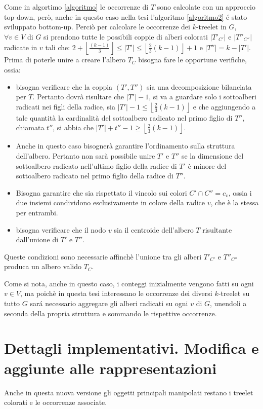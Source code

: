 Come in algortimo \ref{algoritmo} le occorrenze di $ T $ sono calcolate con un approccio top-down,  per\`o, anche in questo caso nella tesi l'algoritmo \ref{algoritmo2} \'e stato sviluppato bottom-up.
Perci\`o per calcolare le occorrenze dei $ k $-treelet in $ G $, $ \forall v \in V $ di $ G $ si prendono tutte le possibili coppie di alberi colorati $ |T'_{C'}| $ e $ |T''_{C''}| $ radicate in $ v $ tali che: $ 2+ \left\lfloor \frac{(k-1)}{3}  \right\rfloor \le |T'| \le \left\lfloor \frac{2}{3}(k-1) \right\rfloor  +1 $ e $ |T''| = k-|T'| $.
Prima di poterle unire a creare l'albero $ T_C $ bisogna fare le opportune verifiche, ossia:
\begin{itemize}
	\item bisogna verificare che la coppia $ (T',T'') $ sia una decomposizione bilanciata per $ T $.
	Pertanto dovr\`a risultare che $ |T'|-1 $, si va a guardare solo i sottoalberi radicati nei figli della radice, sia  
	$ |T'| - 1 \le \left\lfloor\frac{2}{3}(k-1)\right\rfloor $ e che aggiungendo a tale quantit\`a la cardinalit\`a del sottoalbero radicato nel primo figlio di $ T'' $, chiamata $ t'' $, si abbia che $ |T'| + t'' - 1 \ge \left\lfloor\frac{2}{3}(k-1)\right\rfloor $.
	\item Anche in questo caso bisogner\`a garantire l'ordinamento sulla struttura dell'albero.
	Pertanto non sar\`a possibile unire $ T' $ e $ T'' $ se la dimensione del sottoalbero radicato nell'ultimo figlio della radice di $ T' $ \`e minore del sottoalbero radicato nel primo figlio della radice di $ T'' $.
	\item Bisogna garantire che sia rispettato il vincolo sui colori $ C' \cap C'' = c_v$, ossia i due insiemi condividono esclusivamente in colore della radice $ v $, che \`e la stessa per entrambi. 
	\item bisogna verificare che il nodo $ v $ sia il centroide dell'albero $ T $ risultante dall'unione di $ T' $ e $ T'' $.
\end{itemize}
Queste condizioni sono necessarie affinch\`e l'unione tra gli alberi $ T'_{C'} $ e $ T''_{C''} $ produca un albero valido $ T_C $.

Come si nota, anche in questo caso, i conteggi inizialmente vengono fatti su ogni $ v\in V $, ma poich\`e in questa tesi interessano le occorrenze dei diversi $ k $-treelet su tutto $ G $  sar\'a necessario aggregare gli alberi radicati su ogni $ v $ di $ G $, unendoli a seconda della propria struttura e sommando le rispettive occorrenze.

\section{Dettagli implementativi. Modifica e aggiunte alle rappresentazioni}
\label{cap 3:3}
Anche in questa nuova versione gli oggetti principali manipolati restano i treelet colorati e le occorrenze associate.

